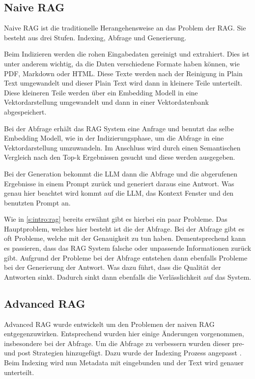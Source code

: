 \subsection{Naive RAG}
Naive RAG ist die traditionelle Herangehensweise an das Problem der RAG.
Sie besteht aus drei Stufen. Indexing, Abfrage und Generierung.\par
Beim Indizieren werden die rohen Eingabedaten gereinigt und extrahiert.
Dies ist unter anderem wichtig, da die Daten verschiedene Formate haben 
können, wie PDF, Markdown oder HTML. Diese Texte werden nach der Reinigung
in Plain Text umgewandelt und dieser Plain Text wird dann in kleinere Teile unterteilt.
Diese kleineren Teile werden über ein Embedding Modell in eine 
Vektordarstellung umgewandelt und dann in einer Vektordatenbank abgespeichert.\cite{gaoRetrievalAugmentedGenerationLarge2024}\par
Bei der Abfrage erhält das RAG System eine Anfrage und benutzt das selbe 
Embedding Modell, wie in der Indizierungsphase, um die Abfrage in eine 
Vektordarstellung umzuwandeln. Im Anschluss wird durch einen Semantischen
Vergleich nach den Top-k Ergebnissen gesucht und diese werden 
ausgegeben.\cite{gaoRetrievalAugmentedGenerationLarge2024}\par
Bei der Generation bekommt die LLM dann die Abfrage und die abgerufenen 
Ergebnisse in einem Prompt zurück und generiert daraus eine Antwort. 
Was genau hier beachtet wird kommt auf die LLM, das Kontext Fenster und den
 benutzten Prompt an\cite{gaoRetrievalAugmentedGenerationLarge2024}.\par
Wie in \ref{s:intro:rag} bereits erwähnt gibt es hierbei ein paar Probleme.
Das Hauptproblem, welches hier besteht ist die der Abfrage. Bei der Abfrage 
gibt es oft Probleme, welche mit der Genauigkeit zu tun haben. Dementsprechend
kann es passieren, dass das RAG System falsche oder unpassende Informationen
zurück gibt. Aufgrund der Probleme bei der Abfrage entstehen dann ebenfalls 
Probleme bei der Generierung der Antwort. Was dazu führt, dass die Qualität 
der Antworten sinkt. Dadurch sinkt dann ebenfalls die Verlässlichkeit auf 
das System\cite{gaoRetrievalAugmentedGenerationLarge2024}.

\subsection{Advanced RAG}
Advanced RAG wurde entwickelt um den Problemen der naiven RAG entgegenzuwirken. 
Entsprechend wurden hier einige Änderungen vorgenommen, 
insbesondere bei der Abfrage. Um die Abfrage zu verbessern 
wurden dieser pre- und post Strategien hinzugefügt.
Dazu wurde der Indexing Prozess angepasst \cite{gaoRetrievalAugmentedGenerationLarge2024, lewisRetrievalAugmentedGenerationKnowledgeIntensive2021}.
Beim Indexing wird nun Metadata mit eingebunden und der Text wird genauer unterteilt.
